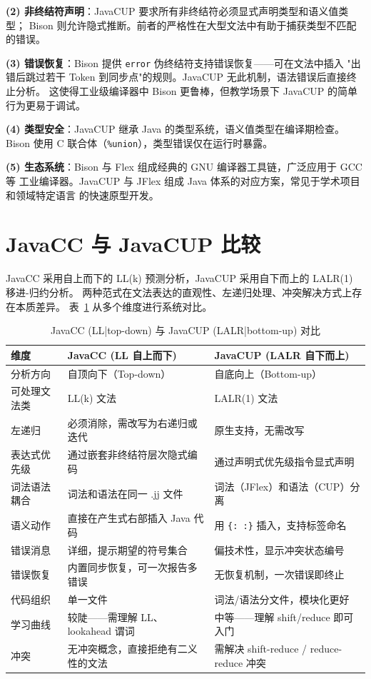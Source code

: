 \documentclass[a4paper]{article}
\begin{document}
\textbf{(2) 非终结符声明}：JavaCUP 要求所有非终结符必须显式声明类型和语义值类型；
Bison 则允许隐式推断。前者的严格性在大型文法中有助于捕获类型不匹配的错误。

\textbf{(3) 错误恢复}：Bison 提供 \texttt{error} 伪终结符支持错误恢复——可在文法中插入
"出错后跳过若干 Token 到同步点"的规则。JavaCUP 无此机制，语法错误后直接终止分析。
这使得工业级编译器中 Bison 更鲁棒，但教学场景下 JavaCUP 的简单行为更易于调试。

\textbf{(4) 类型安全}：JavaCUP 继承 Java 的类型系统，语义值类型在编译期检查。Bison
使用 C 联合体（\texttt{\%union}），类型错误仅在运行时暴露。

\textbf{(5) 生态系统}：Bison 与 Flex 组成经典的 GNU 编译器工具链，广泛应用于 GCC 等
工业编译器。JavaCUP 与 JFlex 组成 Java 体系的对应方案，常见于学术项目和领域特定语言
的快速原型开发。

\section{JavaCC 与 JavaCUP 比较}

JavaCC 采用自上而下的 LL(k) 预测分析，JavaCUP 采用自下而上的 LALR(1) 移进-归约分析。
两种范式在文法表达的直观性、左递归处理、冲突解决方式上存在本质差异。
表~\ref{tab:cup-javacc} 从多个维度进行系统对比。

\begin{table}[H]
\centering
\caption{JavaCC (LL|top-down) 与 JavaCUP (LALR|bottom-up) 对比}
\label{tab:cup-javacc}
\begin{tabular}{@{}p{3cm}p{5.5cm}p{5.5cm}@{}}
\toprule
\textbf{维度} & \textbf{JavaCC (LL 自上而下)} & \textbf{JavaCUP (LALR 自下而上)} \\
\midrule
分析方向 & 自顶向下（Top-down） & 自底向上（Bottom-up） \\
可处理文法类 & LL(k) 文法 & LALR(1) 文法 \\
左递归 & 必须消除，需改写为右递归或迭代 & 原生支持，无需改写 \\
表达式优先级 & 通过嵌套非终结符层次隐式编码 & 通过声明式优先级指令显式声明 \\
词法语法耦合 & 词法和语法在同一 .jj 文件 & 词法（JFlex）和语法（CUP）分离 \\
语义动作 & 直接在产生式右部插入 Java 代码 & 用 \texttt{\{:\ :\}} 插入，支持标签命名 \\
错误消息 & 详细，提示期望的符号集合 & 偏技术性，显示冲突状态编号 \\
错误恢复 & 内置同步恢复，可一次报告多错误 & 无恢复机制，一次错误即终止 \\
代码组织 & 单一文件 & 词法/语法分文件，模块化更好 \\
学习曲线 & 较陡——需理解 LL、lookahead 谓词 & 中等——理解 shift/reduce 即可入门 \\
冲突 & 无冲突概念，直接拒绝有二义性的文法 & 需解决 shift-reduce / reduce-reduce 冲突 \\
\bottomrule
\end{tabular}
\end{table}
\end{document}
